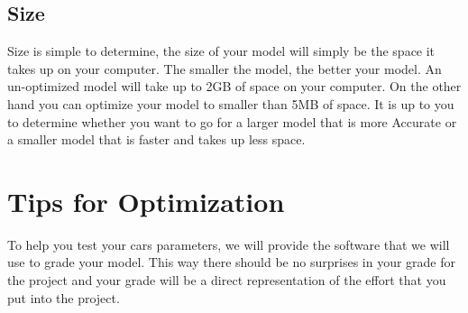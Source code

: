 \documentclass[11pt]{report}
\begin{document}
\section{Size}
Size is simple to determine, the size of your model will simply be the space it takes up on your computer. The smaller the model, the better your model. An un-optimized model will take up to 2GB of space on your computer. On the other hand you can optimize your model to smaller than 5MB of space. It is up to you to determine whether you want to go for a larger model that is more Accurate or a smaller model that is faster and takes up less space.

\chapter{Tips for Optimization}
To help you test your cars parameters, we will provide the software that we will use to grade your model. This way there should be no surprises in your grade for the project and your grade will be a direct representation of the effort that you put into the project.

\end{document}
